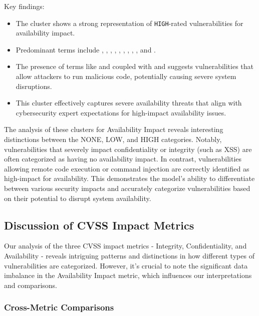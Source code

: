 \documentclass[12pt]{article}
\begin{document}
Key findings:

\begin{itemize}

	\item The cluster shows a strong representation of \texttt{HIGH}-rated vulnerabilities for
	      availability impact.

	\item Predominant terms include , , ,
	      , ,
	      , , , , and .

	\item The presence of terms like  and  coupled with  and 
	      suggests vulnerabilities that allow attackers to run malicious code, potentially causing
	      severe system disruptions.

	\item This cluster effectively captures severe availability threats that align with
	      cybersecurity expert expectations for high-impact availability issues.

\end{itemize}

The analysis of these clusters for Availability Impact reveals interesting distinctions between the
NONE, LOW, and HIGH categories. Notably, vulnerabilities that severely impact confidentiality or
integrity (such as XSS) are often categorized as having no availability impact. In contrast,
vulnerabilities allowing remote code execution or command injection are correctly identified as
high-impact for availability. This demonstrates the model's ability to differentiate between various
security impacts and accurately categorize vulnerabilities based on their potential to disrupt
system availability.


\subsection{Discussion of CVSS Impact Metrics}

Our analysis of the three CVSS impact metrics - Integrity, Confidentiality, and Availability -
reveals intriguing patterns and distinctions in how different types of vulnerabilities are
categorized. However, it's crucial to note the significant data imbalance in the Availability Impact
metric, which influences our interpretations and comparisons.

\subsubsection{Cross-Metric Comparisons}
\end{document}

